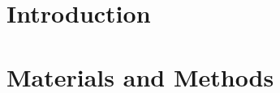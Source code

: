 \documentclass[journal,article,submit,moreauthors,pdftex]{Definitions/mdpi}
\begin{document}


\section{Introduction}



\section{Materials and Methods}
\end{document}
